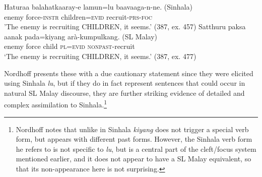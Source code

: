  

\ea\label{ex3.9.4} 
\ea
\gll Haturaa balahatkaaray-e{\ng} lamun=lu ba{\und}avaaga-n-ne. (Sinhala)\\
  enemy  force-\textsc{instr} children=\textsc{evid} recruit-\textsc{prs}-\textsc{foc}  \\
'The enemy is recruiting CHILDREN, it seems.'  (387, ex. 457)
\ex
\gll Satthuru paksa aanak pada=kiyang arà-kumpulkang. (SL Malay)\\
  enemy       force child \textsc{pl}=\textsc{evid} \textsc{nonpast}-recruit  \\
   `The enemy is recruiting CHILDREN, it seems.' (387, ex. 477)
\z
\z

Nordhoff presents these with a due cautionary statement since they were elicited using Sinhala \textit{lu}, but if they do in fact represent sentences that could occur in natural SL Malay discourse, they are further striking evidence of detailed and complex assimilation to Sinhala.\footnote{Nordhoff
  notes that unlike in Sinhala \textit{kiyang} does not trigger a special verb form, but appears with different past forms. However, the Sinhala verb form he refers to is not specific to \textit{lu}, but is a central part of the cleft/focus system mentioned earlier, and it does not appear to have  a SL Malay equivalent, so that its non-appearance here is not surprising.}

